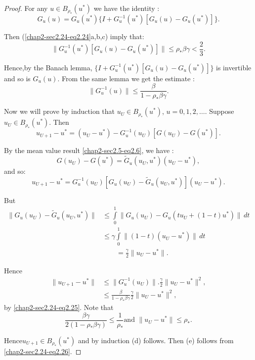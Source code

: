 \begin{proof}
For any $u \in B_{\rho_*} (u^{*})$ we have the identity :  
$$
G_u(u ) = G_u(u^* )\{ I+G_u^{-1} (u^* ) [G_u(u )-G_u(u^* )]\}.  
$$

Then (\ref{chap2-sec2.24-eq2.24}a,b,c) imply that:  
$$
\| G_u^{-1}(u^*)[G_u(u )-G_u(u^* )]\| \leq \rho_* \beta \gamma <
\frac{2}{3}.  
$$

Hence,\pageoriginale by the Banach lemma, $\{ I+G_u^{-1} (u^* )
[G_u(u)-G_u(u^*)]\} $ is invertible and so is $G_u(u)$. From the same 
lemma we get the estimate : 
  \begin{equation*}
\| G^{-1}_u (u) \| \leq \frac {\beta}{1-\rho_* \beta
  \gamma}. \tag{2.25}\label{chap2-sec2.24-eq2.25} 
  \end{equation*}  
 
Now we will prove by induction that $u_U \in B_{\rho_*}(u^*)$,
 $u= 0, 1, 2, \ldots $. Suppose $u_U \in B_{\rho_*}(u^*)$. Then  
 $$
 u_{U+1} - u^* = (u_U- u^*)-  G_u^{-1} (u_U)[G(u_U)- G(u^*)]. 
 $$
 
 By the mean value result \eqref{chap2-sec2.5-eq2.6}, we have : 
 $$
 G(u_U)- G(u^*) = \widetilde{G}_u(u_U, u^*)(u_U - u^*),  
$$
and so: 
$$
u_{U+1} - u^* = G^{-1}_{u} (u_U) [G_u (u_U) - \widetilde{G}_u (u_U,
u^*)] (u_U - u^*).  
$$

But 
\begin{align*}
\| G_u (u_U) - \widetilde{G}_u (u_U, u^*)\|
  & \leq \int\limits^1_0 \| G_u
  (u_U)- G_u (tu_U+(1-t)u^*)\| \, dt\\  
  & \leq \gamma \int\limits^1_0 \| ( 1-t)(u_U - u^*)\| \, dt\\ 
  &\qquad = \frac{\gamma}{2} \| u_U - u^* \|.
\end{align*}
  
  Hence 
\begin{equation*}
  \begin{split} 
  \| u_{U+1} - u^*\|  & \leq \| G_u^{-1}(u_U)\|. \frac{\gamma}{2}\| u_U
  - u^*\|^2, \\ 
    & \leq \frac{\beta}{1-\rho_*\beta \gamma} \frac{\gamma}{2} \| u_U -
  u^* \|^2, 
  \end{split}\tag{2.26}\label{chap2-sec2.24-eq2.26}
\end{equation*}
  by \eqref{chap2-sec2.24-eq2.25}. Note that   
  $$
  \frac{\beta \gamma}{2(1-\rho_* \beta \gamma)} \leq \frac{1}{\rho_*} 
  \text {and } \| u_U-u^* \| \le \rho_*.   
   $$

  Hence\pageoriginale $u_{U+1} \in B_{\rho_*}(u^*)$ and by induction (d)
  follows. Then (e) follows from \eqref{chap2-sec2.24-eq2.26}. 
\end{proof}

